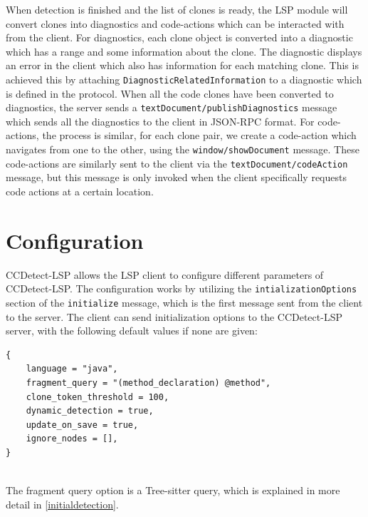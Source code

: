When detection is finished and the list of clones is ready, the LSP module will convert
clones into diagnostics and code-actions which can be interacted with from the client. For
diagnostics, each clone object is converted into a diagnostic which has a range and some
information about the clone. The diagnostic displays an error in the client which also has
information for each matching clone. This is achieved this by attaching
\verb|DiagnosticRelatedInformation| to a diagnostic which is defined in the protocol. When
all the code clones have been converted to diagnostics, the server sends a
\verb|textDocument/publishDiagnostics| message which sends all the diagnostics to the
client in JSON-RPC format. For code-actions, the process is similar, for each clone pair,
we create a code-action which navigates from one to the other, using the
\verb|window/showDocument| message. These code-actions are similarly sent to the client
via the \verb|textDocument/codeAction| message, but this message is only invoked when the
client specifically requests code actions at a certain location.

\section{Configuration}
\label{configuration}

CCDetect-LSP allows the LSP client to configure different parameters of CCDetect-LSP. The
configuration works by utilizing the \verb|intializationOptions| section of the
\verb|initialize| message, which is the first message sent from the client to the server.
The client can send initialization options to the CCDetect-LSP server, with the following
default values if none are given:

\begin{lstlisting}
{
    language = "java",
    fragment_query = "(method_declaration) @method",
    clone_token_threshold = 100,
    dynamic_detection = true,
    update_on_save = true,
    ignore_nodes = [],
}


\end{lstlisting}

The fragment query option is a Tree-sitter query, which is explained in more detail in
\cref{initialdetection}.
